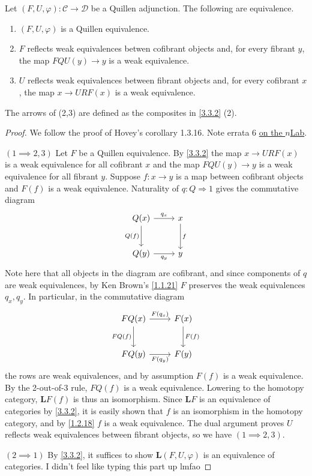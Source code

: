\begin{corollary}\label{3.3.9}
	Let $(F,U,\varphi): \mathcal{C}  \to \mathcal{D} $ be a Quillen adjunction. The following are equivalence.
	\begin{enumerate}
		\item $(F,U,\varphi)$ is a Quillen equivalence.
		\item $F$ reflects weak equivalences betwen cofibrant objects and, for every fibrant $y$, the map $FQU(y)\to y$ is a weak equivalence.
		\item $U$ reflects weak equivalences between fibrant objects and, for every cofibrant $x$, the map $x\to URF(x)$ is a weak equivalence.
	\end{enumerate}
	The arrows of (2,3) are defined as the composites in \cref{3.3.2} (2).
\end{corollary}
\begin{proof}
	We follow the proof of Hovey's corollary 1.3.16. Note errata 6 \href{https://ncatlab.org/nlab/files/Hovey-ModelCategories-Errata.pdf}{on the $n$Lab}.

	$(1\implies 2,3)$ Let $F$ be a Quillen equivalence. By \cref{3.3.2} the map $x\to URF(x)$ is a weak equivalence for all cofibrant $x$ and the map $FQU(y)\to y$ is a weak equivalence for all fibrant $y$. Suppose $f : x \to y$ is a map between cofibrant objects and $F(f)$ is a weak equivalence. Naturality of $q : Q \Rightarrow 1$ gives the commutative diagram
	\[\begin{tikzcd}[row sep = 2.5em, column sep = 2.5em]
	Q(x)\ar[" q_x ", r] \ar[" Q(f) "', d]  & x \ar[" f ", d]  \\
	Q(y)\ar[" q_y "', r]  & y
	\end{tikzcd}\]
	Note here that all objects in the diagram are cofibrant, and since components of $q$ are weak equivalences, by Ken Brown's \cref{1.1.21} $F$ preserves the weak equivalences $q_x,q_y$. In particular, in the commutative diagram
	\[\begin{tikzcd}[row sep = 2.5em, column sep = 2.5em]
	FQ(x)\ar[" F(q_x) ", r] \ar[" FQ(f) "', d]  & F(x)\ar[" F(f) ", d]  \\
	FQ(y)\ar[" F(q_y) "', r]  & F(y)
	\end{tikzcd}\]
	the rows are weak equivalences, and by assumption $F(f)$ is a weak equivalence. By the 2-out-of-3 rule, $FQ(f)$ is a weak equivalence. Lowering to the homotopy category, $\mathbf{L} F(f)$ is thus an isomorphism. Since $\mathbf{L} F$ is an equivalence of categories by \cref{3.3.2}, it is easily shown that $f$ is an isomorphism in the homotopy category, and by \cref{1.2.18} $f$ is a weak equivalence. The dual argument proves $U$ reflects weak equivalences between fibrant objects, so we have $(1\implies 2,3)$.

	$(2\implies 1)$ By \cref{3.3.2}, it suffices to show $\mathbf{L} (F,U,\varphi)$ is an equivalence of categories. I didn't feel like typing this part up lmfao
\end{proof}

